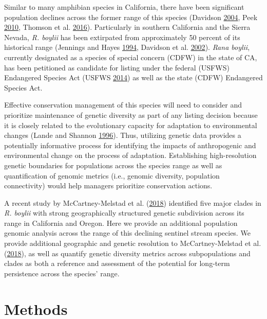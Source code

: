 \documentclass[proquest,12pt,final]{ucthesis-CA2012} %
\begin{document}
\begin{ucmainmatter}
Similar to many amphibian species in California, there have been
significant population declines across the former range of this species
(Davidson \protect\hyperlink{ref-davidson_declining_2004}{2004}, Peek
\protect\hyperlink{ref-peek_landscape_2010}{2010}, Thomson et al.
\protect\hyperlink{ref-thomson_california_2016}{2016}). Particularly in
southern California and the Sierra Nevada, \emph{R. boylii} has been
extirpated from approximately 50 percent of its historical range
(Jennings and Hayes
\protect\hyperlink{ref-jennings_amphibian_1994}{1994}, Davidson et al.
\protect\hyperlink{ref-davidson_spatial_2002}{2002}). \emph{Rana
boylii}, currently designated as a species of special concern (CDFW) in
the state of CA, has been petitioned as candidate for listing under the
federal (USFWS) Endangered Species Act (USFWS
\protect\hyperlink{ref-usfws_endangered_2014}{2014}) as well as the
state (CDFW) Endangered Species Act.

Effective conservation management of this species will need to consider
and prioritize maintenance of genetic diversity as part of any listing
decision because it is closely related to the evolutionary capacity for
adaptation to environmental changes (Lande and Shannon
\protect\hyperlink{ref-lande_role_1996}{1996}). Thus, utilizing genetic
data provides a potentially informative process for identifying the
impacts of anthropogenic and environmental change on the process of
adaptation. Establishing high-resolution genetic boundaries for
populations across the species range as well as quantification of
genomic metrics (i.e., genomic diversity, population connectivity) would
help managers prioritize conservation actions.

A recent study by McCartney-Melstad et al.
(\protect\hyperlink{ref-mccartney-melstad_population_2018}{2018})
identified five major clades in \emph{R. boylii} with strong
geographically structured genetic subdivision across its range in
California and Oregon. Here we provide an additional population genomic
analysis across the range of this declining sentinel stream species. We
provide additional geographic and genetic resolution to
McCartney-Melstad et al.
(\protect\hyperlink{ref-mccartney-melstad_population_2018}{2018}), as
well as quantify genetic diversity metrics across subpopulations and
clades as both a reference and assessment of the potential for long-term
persistence across the species' range.

\hypertarget{methods-2}{%
\section{Methods}\label{methods-2}}


\end{ucmainmatter}
\end{document}
